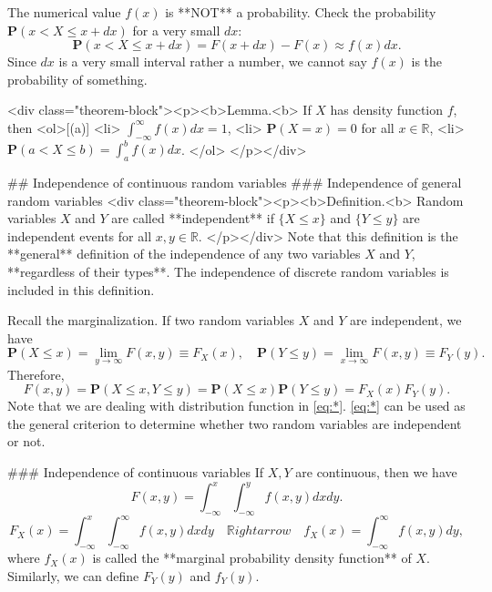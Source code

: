 The numerical value $f(x)$ is **NOT** a probability. Check the probability $\mathbf{P}(x < X \leq x + dx)$ for a very small $dx$:
$$\begin{equation}
    \mathbf{P}(x < X \leq x + dx) = F(x + dx) - F(x) \approx f(x) dx. 
\end{equation}$$
Since $dx$ is a very small interval rather a number, we cannot say $f(x)$ is the probability of something.

<div class="theorem-block"><p><b>Lemma.<b> 
If $X$ has density function $f$, then
<ol>[(a)]
    <li> $\int_{-\infty}^\infty f(x)dx = 1$,
    <li> $\mathbf{P}(X=x) = 0$ for all $x \in \mathbb{R}$,
    <li> $\mathbf{P}(a < X \leq b) = \int_a^b f(x)dx$.
</ol>
</p></div>

## Independence of continuous random variables
### Independence of general random variables
<div class="theorem-block"><p><b>Definition.<b> 
Random variables $X$ and $Y$ are called **independent** if $\{ X \leq x\}$ and $\{Y \leq y\}$ are independent events for all $x, y \in \mathbb{R}$. 
</p></div>
Note that this definition is the **general** definition of the independence of any two variables $X$ and $Y$, **regardless of their types**. The independence of discrete random variables is included in this definition. 

Recall the marginalization. If two random variables $X$ and $Y$ are independent, we have
$$\begin{equation}
    \mathbf{P}(X\leq x) = \lim_{y\to\infty}F(x, y) \equiv F_X(x), \quad 
    \mathbf{P}(Y \leq y) = \lim_{x\to\infty}F(x, y) \equiv F_Y(y).
\end{equation}$$
Therefore,
$$$$\begin{equation}
    \label{eq:*}
    \tag{*}
    F(x,y) = \mathbf{P}(X \leq x, Y \leq y) = \mathbf{P}(X\leq x) \mathbf{P}(Y \leq y) = F_X(x) F_Y(y). 
\end{equation}$$$$
Note that we are dealing with distribution function in \eqref{eq:*}. \eqref{eq:*} can be used as the general criterion to determine whether two random variables are independent or not.

### Independence of continuous variables
If $X, Y$ are continuous, then we have
$$\begin{equation}
    F(x, y) = \int_{-\infty}^x \int_{-\infty}^y f(x,y) dx dy.
\end{equation}$$
$$\begin{equation}
    F_X(x) = \int_{-\infty}^x \int_{-\infty}^\infty f(x, y)dx dy \quad \mathbb{R}ightarrow \quad f_X(x) = \int_{-\infty}^\infty f(x,y)dy,
\end{equation}$$
where $f_X(x)$ is called the **marginal probability density function** of $X$. Similarly, we can define $F_Y(y)$ and $f_Y(y)$.

